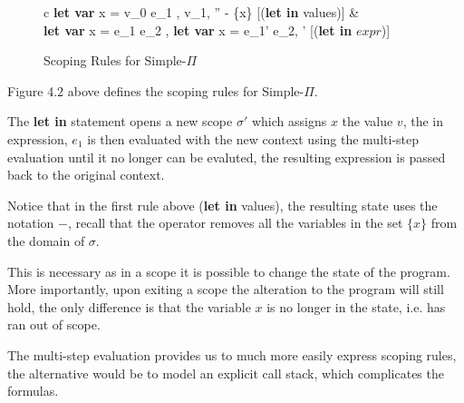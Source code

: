 \documentclass[a4paper,12pt]{report}
\begin{document}
\begin{figure}[H]
  \begin{center}
    \begin{tabular}{c}
      {\langle\textbf{let var }x = v_0  e_1 , \sigma \rangle 
      \Longrightarrow \langle v_1, '' - \{x\} \rangle} [(\textbf{let in} values)] 
      & \\
      {\langle \textbf{let var }x = e_1  e_2 , \sigma \rangle 
      \Longrightarrow \langle\textbf{let var }x = e_1'  e_2, \sigma' \rangle} 
      [(\textbf{let in} $expr$)]
    \end{tabular}
  \end{center}
  \caption{Scoping Rules for Simple-$\Pi$}
\end{figure}

\par
Figure 4.2 above defines the scoping rules for Simple-$\Pi$.

\par
The \textbf{let in} statement opens a new scope $\sigma'$ which 
assigns $x$ the value $v$, the in expression, $e_1$ is then evaluated with the 
new context using the multi-step evaluation until it no longer can be evaluted, 
the resulting expression is passed back to the original context.

\par 
Notice that in the first rule above (\textbf{let in } values), the resulting state 
uses the notation $-$, recall that the operator removes all the variables in the set 
$\{x\}$ from the domain of $\sigma$. 

\par
This is necessary as in a scope it is possible to change the state of the 
program. More importantly, upon exiting a scope the alteration to the program 
will still hold, the only difference is that the variable $x$ is no longer in 
the state, i.e. has ran out of scope.

\par
The multi-step evaluation provides us to much more easily express scoping rules, 
the alternative would be to model an explicit call stack, which complicates the 
formulas.
\end{document}
